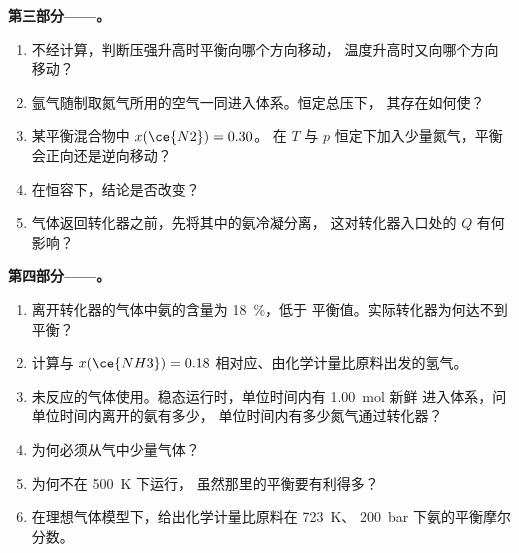 \begin{problem}
\medskip
\noindent\textbf{第三部分——。}
\begin{enumerate}[resume]
  \item 不经计算，判断压强升高时平衡向哪个方向移动，
        温度升高时又向哪个方向移动？
  \item 氩气随制取氮气所用的空气一同进入体系。恒定总压下，
        其存在如何使？
  \item 某平衡混合物中 $x(\ce{N2}) = 0.30$。
        在 $T$ 与 $p$ 恒定下加入少量氮气，平衡会正向还是逆向移动？
  \item 在恒容下，结论是否改变？
  \item 气体返回转化器之前，先将其中的氨冷凝分离，
        这对转化器入口处的 $Q$ 有何影响？
\end{enumerate}

\medskip
\noindent\textbf{第四部分——。}
\begin{enumerate}[resume]
  \item 离开转化器的气体中氨的含量为 \qty{18}{\percent}，低于
        平衡值。实际转化器为何达不到
        平衡？
  \item 计算与
        $x(\ce{NH3}) = 0.18$ 相对应、由化学计量比原料出发的氢气。
  \item 未反应的气体使用。稳态运行时，单位时间内有 \qty{1.00}{mol}
        新鲜  进入体系，问单位时间内离开的氨有多少，
        单位时间内有多少氮气通过转化器？
  \item 为何必须从气中少量气体？
  \item 为何不在 \qty{500}{K} 下运行，
        虽然那里的平衡要有利得多？
  \item 在理想气体模型下，给出化学计量比原料在 \qty{723}{K}、
        \qty{200}{bar} 下氨的平衡摩尔分数。
\end{enumerate}
\end{problem}
